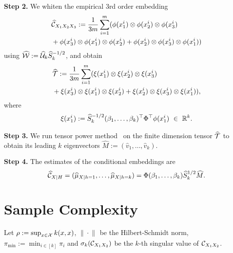 \documentclass{article}
\begin{document}
{\bf Step 2.} We whiten the empirical 3rd order embedding
\begin{align*}
  &\widehat {\mathcal{C}}_{X_1 X_2 X_3}:= \frac{1}{3m}\sum_{i=1}^{m} (\phi(x_1^i) \otimes \phi(x_2^i) \otimes \phi(x_3^i) \\
  &+ \phi(x_3^i) \otimes \phi(x_1^i) \otimes \phi(x_2^i) + \phi(x_2^i) \otimes \phi(x_3^i) \otimes \phi(x_1^i))
\end{align*}
using $\widehat {\mathcal{W}}:= \widehat {\mathcal{U}}_k \widehat S_k^{-1/2}$, and obtain
\begin{align*}
  &\widehat {{\mathcal{T}}} := \frac{1}{3m}\sum_{i=1}^m (\xi(x_1^i) \otimes \xi(x_2^i) \otimes \xi(x_3^i) \\
  &+ \xi(x_3^i) \otimes \xi(x_1^i) \otimes \xi(x_2^i) + \xi(x_2^i) \otimes \xi(x_3^i) \otimes \xi(x_1^i)),
\end{align*}
where
$$
	\xi(x_1^i) := \widehat S_k^{-1/2} (\beta_1,\ldots,\beta_k)^\top \Phi^\top \phi(x_1^i)~ \in~\mathbb{R}^k.
$$

{\bf Step 3.} We run tensor power method~\cite{AnandkumarEtal:community12} on the finite dimension tensor $\widehat {{\mathcal{T}}}$ to obtain its leading $k$ eigenvectors $\widehat M:=(\widehat v_1,\ldots,\widehat v_k)$.

{\bf Step 4.} The estimates of the conditional embeddings are
\begin{align*}
  \widehat {\mathcal{C}}_{X|H} = (\widehat \mu_{X|h=1},\ldots, \widehat \mu_{X|h=k}) = \Phi (\beta_1,\ldots,\beta_k) \widehat  S_k^{1/2} \widehat M.
\end{align*}

\section{Sample Complexity}

Let $\rho:=\sup_{x \in \mathcal{X}} k(x,x)$,   $\| \cdot\|_{}$ be the Hilbert-Schmidt norm, $\pi_{\min}:=\min_{i\in [k]} \pi_i$ and $\sigma_k(\mathcal{C}_{X_1X_2})$ be the $k$-th singular value of $\mathcal{C}_{X_1X_2}$.

\end{document}
